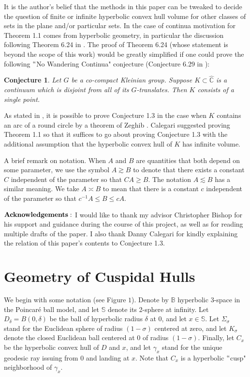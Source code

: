 \documentclass[11pt]{article}
\newtheorem{conj}[tm]{Conjecture}
\newcommand\n{\noindent}
\newcommand\comp{{\mathbb{C}}}
\newcommand\ball{{\mathbb{B}}}
\newcommand\sph{{\mathbb{S}}}
\begin{document}
 It is the author's belief that the methods in this paper can be tweaked to decide the question of finite or infinite hyperbolic convex hull volume for other classes of sets in the plane and/or particular sets. In the case of continua motivation for Theorem 1.1 comes from hyperbolic geometry, in particular the discussion following Theorem 6.24 in \cite{cal}. The proof of Theorem 6.24 (whose statement is beyond the scope of this work) would be greatly simplified if one could prove the following $``$No Wandering Continua" conjecture (Conjecture 6.29 in \cite{cal}):

\begin{conj}
    Let $G$ be a co-compact Kleinian group. Suppose $K \subset \hat{\comp}$ is a continuum which is disjoint from all of its $G$-translates. Then $K$ consists of a single point. 
\end{conj} 

As stated in \cite{cal}, it is possible to prove Conjecture 1.3 in the case when $K$ contains an arc of a round circle by a theorem of Zeghib \cite{zeg}. Calegari \cite{cal2} suggested proving Theorem 1.1 so that it suffices to go about proving Conjecture 1.3  with the additional assumption that the hyperbolic convex hull of $K$ has infinite volume. 

\bigskip

A brief remark on notation. When $A$ and $B$ are quantities that both depend on some parameter, we use the symbol $A \gtrsim B$ to denote that there exists a constant $C$ independent of the parameter so that $CA \geq B$. The notation $A \lesssim B$ has a similar meaning. We take $A \asymp B$ to mean that there is a constant $c$ independent of the parameter so that $c^{-1}A \leq B \leq cA$. 

\bigskip

\noindent $\bf{Acknowledgements:}$ I would like to thank my advisor Christopher Bishop for his support and guidance during the course of this project, as well as for reading multiple drafts of the paper. I also thank Danny Calegari for kindly explaining the relation of this paper's contents to Conjecture 1.3.

\section{Geometry of Cuspidal Hulls}

\n

We begin with some notation (see Figure $1$). Denote by $\ball$  hyperbolic 3-space in the Poincar\'{e} ball model, and let $\sph$ denote its 2-sphere at infinity. Let  $D_\delta = B(0, \delta)$ be the ball of hyperbolic radius $\delta$ at $0$, and let $x \in \sph$. Let $\Sigma_\sigma$ stand for the Euclidean sphere of radius $(1-\sigma)$ centered at zero, and let $K_\sigma$ denote the closed Euclidean ball centered at $0$ of radius $(1-\sigma)$. Finally, let $C_x$ be the hyperbolic convex hull of $D$ and $x$, and let $\gamma_x$ stand for the unique geodesic ray issuing from $0$ and landing at $x$. Note that $C_x$ is a hyperbolic $  ``$cusp" neighborhood of $\gamma_x$. 
\end{document}
